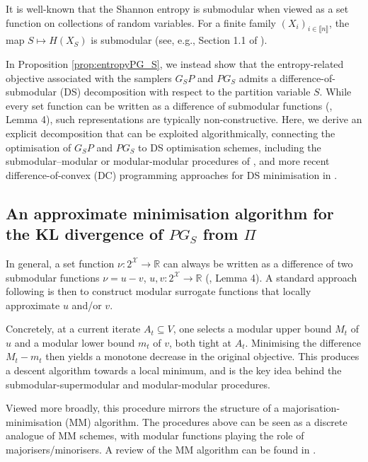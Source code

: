 \documentclass[EJP]{ejpecp} %
\begin{document}
It is well-known that the Shannon entropy is submodular when viewed as a set function on collections of random variables. For a finite family $(X_i)_{i \in \llbracket n \rrbracket}$, the map $S \mapsto H(X_S)$ is submodular (see, e.g., Section 1.1 of \cite{Krause_Golovin_2014}). 

In Proposition \ref{prop:entropyPG_S}, we instead show that the entropy-related objective associated with the samplers $G_SP$ and $PG_S$ admits a difference-of-submodular (DS) decomposition with respect to the partition variable $S$. While every set function can be written as a difference of submodular functions (\cite{Bilmes_subsup}, Lemma 4), such representations are typically non-constructive. Here, we derive an explicit decomposition that can be exploited algorithmically, connecting the optimisation of $G_SP$ and $PG_S$ to DS optimisation schemes, including the submodular–modular or modular-modular procedures of \cite{Bilmes_subsup}, and more recent difference-of-convex (DC) programming approaches for DS minimisation in \cite{halabi_dc}.

\subsection{An approximate minimisation algorithm for the KL divergence of $PG_S$ from $\Pi$}\label{subsec:MMKL}

In general, a set function $\nu: 2^\mathcal{X} \to \mathbb{R}$ can always be written as a difference of two submodular functions $\nu = u - v$, $u, v: 2^\mathcal{X} \to \mathbb{R}$ (\cite{Bilmes_subsup}, Lemma 4). A standard approach following \cite{iyer2013algorithmsapproximateminimizationdifference} is then to construct modular surrogate functions that locally approximate $u$ and/or $v$. 

Concretely, at a current iterate $A_t \subseteq V$, one selects a modular upper bound $M_t$ of $u$ and a modular lower bound $m_t$ of $v$, both tight at $A_t.$ Minimising the difference $M_t - m_t$ then yields a monotone decrease in the original objective. This produces a descent algorithm towards a local minimum, and is the key idea behind the submodular-supermodular and modular-modular procedures. 

Viewed more broadly, this procedure mirrors the structure of a majorisation-minimisation (MM) algorithm. The procedures above can be seen as a discrete analogue of MM schemes, with modular functions playing the role of majorisers/minorisers. A review of the MM algorithm can be found in \cite{Hunter01022004}.
\end{document}
